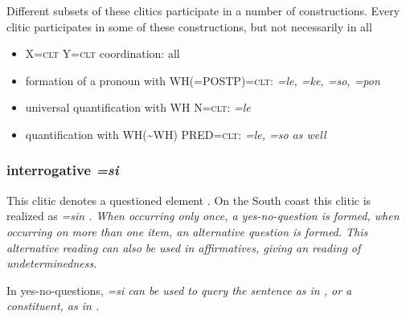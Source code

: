 
Different subsets of these clitics participate in a number of constructions. Every clitic participates in some of these constructions, but not necessarily in all

\begin{itemize}\label{page:list:morph:clt}
 \item  X=\textsc{clt} Y=\textsc{clt} coordination: all 
 \item formation of a pronoun with WH(=POSTP)=\textsc{clt}: \em =le, =ke, =so, =pon \em {}
\item  universal quantification with WH N=\textsc{clt}: \em =le \em  {}
 \item  quantification with WH(\~{}WH) PRED=\textsc{clt}:  \em =le, =so \em {} as well
\end{itemize}


\subsubsection{interrogative \em=si\em}\label{sec:morph:=si}
This clitic denotes a questioned element \citep[50]{Jayasuriya2002}. On the South coast this clitic is realized as \em =sin \em \citep{Slomanson2008ismil}. When occurring only once, a yes-no-question is formed, when occurring on more than one item, an alternative question is formed. This alternative reading can also be used in affirmatives, giving an reading of undeterminedness.
 
In yes-no-questions, \em =si \em can be used to query the sentence as  in , or  a constituent, as in  .



